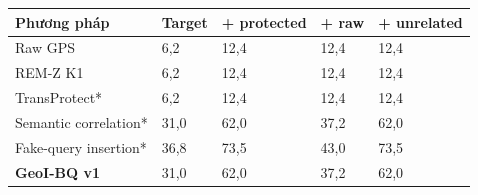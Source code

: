 \par\smallskip\noindent\begin{tabularx}{\linewidth}{@{}P{3.2cm}XXXX@{}}\toprule
\textbf{Phương pháp} & \textbf{Target} & \textbf{+ protected} & \textbf{+ raw} & \textbf{+ unrelated} \\
\midrule
Raw GPS & 6{,}2 & 12{,}4 & 12{,}4 & 12{,}4 \\
REM-Z K1 & 6{,}2 & 12{,}4 & 12{,}4 & 12{,}4 \\
TransProtect* & 6{,}2 & 12{,}4 & 12{,}4 & 12{,}4 \\
Semantic correlation* & 31{,}0 & 62{,}0 & 37{,}2 & 62{,}0 \\
Fake-query insertion* & 36{,}8 & 73{,}5 & 43{,}0 & 73{,}5 \\
\textbf{GeoI-BQ v1} & 31{,}0 & 62{,}0 & 37{,}2 & 62{,}0 \\
\bottomrule\end{tabularx}\par\smallskip
